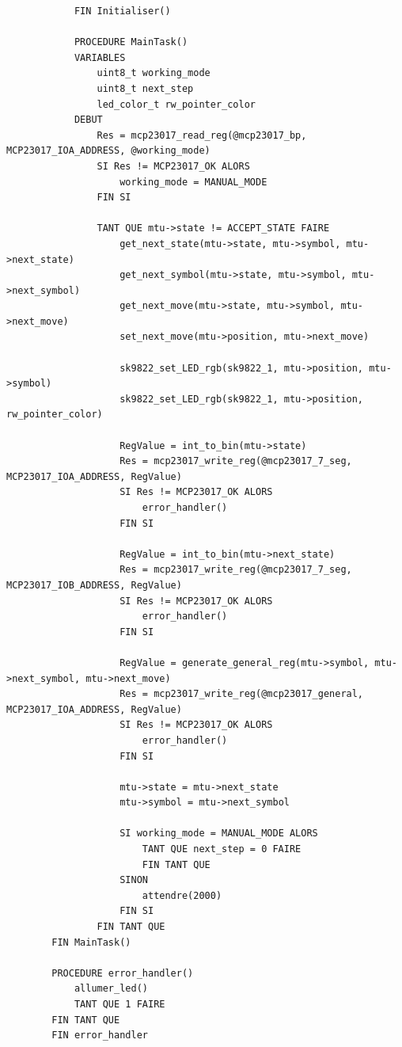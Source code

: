 \documentclass[12pt]{report}
\begin{document}
\begin{lstlisting}
			FIN Initialiser()
		
			PROCEDURE MainTask()
			VARIABLES
				uint8_t working_mode
				uint8_t next_step
				led_color_t rw_pointer_color
			DEBUT
				Res = mcp23017_read_reg(@mcp23017_bp, MCP23017_IOA_ADDRESS, @working_mode)
				SI Res != MCP23017_OK ALORS
					working_mode = MANUAL_MODE
				FIN SI
		
				TANT QUE mtu->state != ACCEPT_STATE FAIRE
					get_next_state(mtu->state, mtu->symbol, mtu->next_state)
					get_next_symbol(mtu->state, mtu->symbol, mtu->next_symbol)
					get_next_move(mtu->state, mtu->symbol, mtu->next_move)
					set_next_move(mtu->position, mtu->next_move)
		
					sk9822_set_LED_rgb(sk9822_1, mtu->position, mtu->symbol)
					sk9822_set_LED_rgb(sk9822_1, mtu->position, rw_pointer_color)
		
					RegValue = int_to_bin(mtu->state)
					Res = mcp23017_write_reg(@mcp23017_7_seg, MCP23017_IOA_ADDRESS, RegValue)
					SI Res != MCP23017_OK ALORS
						error_handler()
					FIN SI
		
					RegValue = int_to_bin(mtu->next_state)
					Res = mcp23017_write_reg(@mcp23017_7_seg, MCP23017_IOB_ADDRESS, RegValue)
					SI Res != MCP23017_OK ALORS
						error_handler()
					FIN SI
		
					RegValue = generate_general_reg(mtu->symbol, mtu->next_symbol, mtu->next_move)
					Res = mcp23017_write_reg(@mcp23017_general, MCP23017_IOA_ADDRESS, RegValue)
					SI Res != MCP23017_OK ALORS
						error_handler()
					FIN SI
		
					mtu->state = mtu->next_state
					mtu->symbol = mtu->next_symbol
		
					SI working_mode = MANUAL_MODE ALORS
						TANT QUE next_step = 0 FAIRE
						FIN TANT QUE
					SINON
						attendre(2000)
					FIN SI
				FIN TANT QUE
		FIN MainTask()
		
		PROCEDURE error_handler()
			allumer_led()
			TANT QUE 1 FAIRE
		FIN TANT QUE
		FIN error_handler
	\end{lstlisting}
\end{document}
